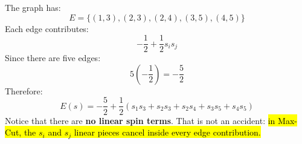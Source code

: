 \highspace
{} The graph has:
\begin{equation*}
    E=
    \{(1,3),(2,3),(2,4),(3,5),(4,5)\}
\end{equation*}
Each edge contributes:
\begin{equation*}
    -\frac{1}{2} + \frac{1}{2} s_i s_j
\end{equation*}
Since there are five edges:
\begin{equation*}
    5\left(-\frac{1}{2}\right)
    =
    -\frac{5}{2}
\end{equation*}
Therefore:
\begin{equation*}
    \boxed{
        E(s)
        =
        -\frac{5}{2}
        +
        \frac{1}{2}
        \left(
            s_1s_3
            +s_2s_3
            +s_2s_4
            +s_3s_5
            +s_4s_5
        \right)
    }
\end{equation*}
\textcolor{Green3}{} Notice that there are \textbf{no linear spin terms}.
That is not an accident: \hl{in Max-Cut, the $s_i$ and $s_j$ linear pieces cancel inside every edge contribution.}

